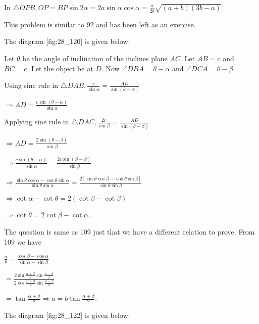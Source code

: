   In $\triangle OPB, OP = BP\sin2\alpha = 2a\sin\alpha\cos\alpha = \frac{a}{2b}\sqrt{(a + b)(3b - a)}$

\item This problem is similar to 92 and has been left as an exercise.

\item The diagram [fig:28_120] is given below:

  \startplacefigure[reference=fig:28_120]
    \externalfigure[28_120.pdf]
  \stopplacefigure

  Let $\theta$ be the angle of inclination of the inclines plane $AC$. Let $AB = c$ and
  $BC = c$. Let the object be at $D$. Now $\angle DBA = \theta - \alpha$ and
  $\angle DCA = \theta - \beta$.

  Using sine rule in $\triangle DAB, \frac{c}{\sin\alpha} = \frac{AD}{\sin(\theta - \alpha)}$

  $\Rightarrow AD = \frac{c\sin(\theta - \alpha)}{\sin\alpha}$

  Applying sine rule in $\triangle DAC, \frac{2c}{\sin\beta} = \frac{AD}{\sin(\theta - \beta)}$

  $\Rightarrow AD = \frac{2\sin(\theta - \beta)}{\sin\beta}$

  $\Rightarrow \frac{c\sin(\theta - \alpha)}{\sin\alpha} = \frac{2c\sin(\beta - \beta)}{\sin\beta}$

  $\Rightarrow \frac{\sin\theta\cos\alpha - \cos\theta\sin\alpha}{\sin\theta\sin\alpha} =
  \frac{2[\sin\theta\cos\beta - \cos\theta\sin\beta]}{\sin\theta\sin\beta}$

  $\Rightarrow \cot\alpha - \cot\theta = 2(\cot\beta - \cot\beta)$

  $\Rightarrow \cot\theta = 2\cot\beta - \cot\alpha$.

\item The question is same as 109 just that we have a different relation to prove. From 109
  we have

  $\frac{a}{b} = \frac{\cos\beta - \cos\alpha}{\sin\alpha - \sin\beta}$

  $= \frac{2\sin\frac{\alpha + \beta}{2}\sin\frac{\alpha - \beta}{2}}{2\cos\frac{\alpha +
      \beta}{2}\sin\frac{\alpha - \beta}{2}}$

  $= \tan\frac{\alpha + \beta}{2}\Rightarrow a = b\tan\frac{\alpha + \beta}{2}$.

\item The diagram [fig:28_122] is given below:

  \startplacefigure[reference=fig:28_122]
    \externalfigure[28_122.pdf]
  \stopplacefigure

